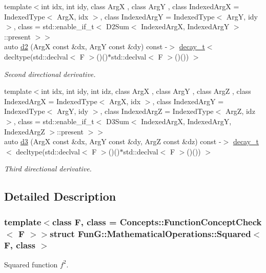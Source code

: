 \begin{DoxyCompactItemize}
{\footnotesize template$<$int idx, int idy, class Arg\-X , class Arg\-Y , class Indexed\-Arg\-X  = Indexed\-Type$<$ Arg\-X, idx $>$, class Indexed\-Arg\-Y  = Indexed\-Type$<$ Arg\-Y, idy $>$, class  = std\-::enable\-\_\-if\-\_\-t$<$ D2\-Sum$<$ Indexed\-Arg\-X, Indexed\-Arg\-Y $>$\-::present $>$$>$ }\\auto \hyperlink{structFunG_1_1MathematicalOperations_1_1Squared_a2ea1f051222fa8948175b4a49d5b35ca}{d2} (Arg\-X const \&dx, Arg\-Y const \&dy) const -\/$>$ \hyperlink{namespaceFunG_a7ff91644f18a190ac3d4fc9e970ebe2e}{decay\-\_\-t}$<$ decltype(std\-::declval$<$ F $>$()()$\ast$std\-::declval$<$ F $>$()()) $>$
\begin{DoxyCompactList}\small\item\em Second directional derivative. \end{DoxyCompactList}\item 
{\footnotesize template$<$int idx, int idy, int idz, class Arg\-X , class Arg\-Y , class Arg\-Z , class Indexed\-Arg\-X  = Indexed\-Type$<$ Arg\-X, idx $>$, class Indexed\-Arg\-Y  = Indexed\-Type$<$ Arg\-Y, idy $>$, class Indexed\-Arg\-Z  = Indexed\-Type$<$ Arg\-Z, idz $>$, class  = std\-::enable\-\_\-if\-\_\-t$<$                           D3\-Sum$<$ Indexed\-Arg\-X, Indexed\-Arg\-Y, Indexed\-Arg\-Z $>$\-::present $>$$>$ }\\auto \hyperlink{structFunG_1_1MathematicalOperations_1_1Squared_a44cab0174b79d43e21ecdf613bc84c15}{d3} (Arg\-X const \&dx, Arg\-Y const \&dy, Arg\-Z const \&dz) const -\/$>$ \hyperlink{namespaceFunG_a7ff91644f18a190ac3d4fc9e970ebe2e}{decay\-\_\-t}$<$ decltype(std\-::declval$<$ F $>$()()$\ast$std\-::declval$<$ F $>$()()) $>$
\begin{DoxyCompactList}\small\item\em Third directional derivative. \end{DoxyCompactList}\end{DoxyCompactItemize}


\subsection{Detailed Description}
\subsubsection*{template$<$class F, class = Concepts\-::\-Function\-Concept\-Check$<$ F $>$$>$struct Fun\-G\-::\-Mathematical\-Operations\-::\-Squared$<$ F, class $>$}

Squared function $f^2$. 

